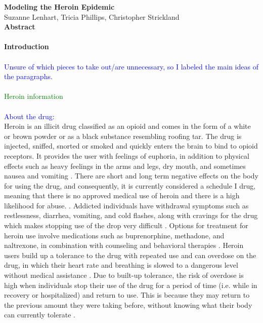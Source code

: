 \documentclass[12pt]{article}
\begin{document}
\textbf{\large{Modeling the Heroin Epidemic}} \\
Suzanne Lenhart, Tricia Phillips, Christopher Strickland \\

\textbf{Abstract} \\ \\
\textbf{Introduction} \\ \\
\textcolor{blue}{Unsure of which pieces to take out/are unnecessary, so I labeled the main ideas of the paragraphs.} \\ \\
\textcolor{green}{Heroin information} \\ \\
\textcolor{blue}{About the drug:} \\
Heroin is an illicit drug classified as an opioid and comes in the form of a white or brown powder or as a black substance resembling roofing tar. The drug is injected, sniffed, snorted or smoked and quickly enters the brain to bind to opioid receptors. It provides the user with feelings of euphoria, in addition to physical effects such as heavy feelings in the arms and legs, dry mouth, and sometimes nausea and vomiting \cite{NIH1, NIDA2}. There are short and long term negative effects on the body for using the drug, and consequently, it is currently considered a schedule I drug, meaning that there is no approved medical use of heroin and there is a high likelihood for abuse. \cite{DEA1, NIH1}. Addicted individuals have withdrawal symptoms such as restlessness, diarrhea, vomiting, and cold flashes, along with cravings for the drug which makes stopping use of the drop very difficult \cite{NIH1}. Options for treatment for heroin use involve medications such as buprenorphine, methadone, and naltrexone, in combination with counseling and behavioral therapies \cite{SAMSHA1, NIH1}. Heroin users build up a tolerance to the drug with repeated use and can overdose on the drug, in which their heart rate and breathing is slowed to a dangerous level without medical assistance \cite{NIDA2, NIH1}. Due to built-up tolerance, the risk of overdose is high when individuals stop their use of the drug for a period of time (i.e. while in recovery or hospitalized) and return to use. This is because they may return to the previous amount they were taking before, without knowing what their body can currently tolerate \cite{NIH2}.  
\end{document}
